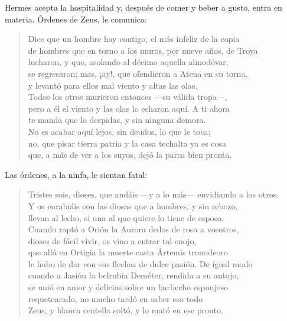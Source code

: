 \documentclass[11pt,a4paper]{article}
\begin{document}
Hermes acepta la hospitalidad y, después de comer y beber a gusto, entra en materia. Órdenes de Zeus, le comunica:

\begin{verse}
Dice que un hombre hay contigo, el más infeliz de la copia\\
de hombres que en torno a los muros, por nueve años, de Troya\\
lucharon, y que, asolando al décimo aquella almodóvar,\\
se regresaron; mas, ¡ay!, que ofendieron a Atena en su torna,\\
y levantó para ellos mal viento y altas las olas.\\
Todos los otros murieron entonces ---su válida tropa---,\\
pero a él el viento y las olas lo echaron aquí. A ti ahora\\
te manda que lo despidas, y sin ninguna demora.\\
No es acabar aquí lejos, sin deudos, lo que le toca;\\
no, que pisar tierra patria y la casa techalta ya es cosa\\
que, a más de ver a los suyos, dejó la parca bien pronta.
\end{verse}

Las órdenes, a la ninfa, le sientan fatal:

\begin{verse}
Tristes sois, dioses, que andáis ---y a lo más--- envidiando a los otros.\\
Y os enrabiáis con las diosas que a hombres, y sin rebozo,\\
llevan al lecho, si una al que quiere lo tiene de esposo.\\
Cuando raptó a Orión la Aurora dedos de rosa a vosotros,\\
dioses de fácil vivir, os vino a entrar tal enojo,\\
que allá en Ortigia la muerte casta Ártemis tronodeoro\\
le hubo de dar con sus flechas de dulce pasión. De igual modo\\
cuando a Jasión la belrubia Deméter, rendida a su antojo,\\
se unió en amor y delicias sobre un barbecho esponjoso\\
requetearado, no mucho tardó en saber eso todo\\
Zeus, y blanca centella soltó, y lo mató en ese pronto.
\end{verse}
\end{document}
